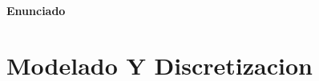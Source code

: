 \documentclass[10pt,a4paper]{article}
\begin{document}
		
	\setcounter{page}{1}

\begin{center}{\Large{\textbf{Enunciado}}}\end{center}
%	

	
	
	\section{Modelado Y Discretizacion}\label{sec:ej1}
	
		
%		
%
%		
%
%		
%
%		
%
%		
%
%		
%
%		

\end{document}
